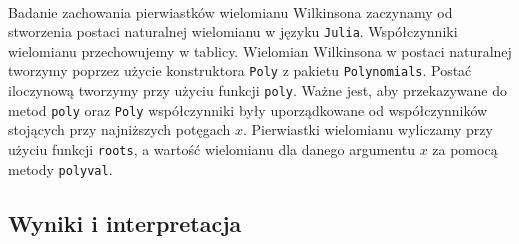 \documentclass[a4paper]{article}
\begin{document}
\paragraph{}
Badanie zachowania pierwiastków wielomianu Wilkinsona zaczynamy od stworzenia postaci naturalnej wielomianu w języku \texttt{Julia}. Współczynniki wielomianu przechowujemy w tablicy. Wielomian Wilkinsona w postaci naturalnej tworzymy poprzez użycie konstruktora \texttt{Poly} z pakietu \texttt{Polynomials}. Postać iloczynową tworzymy przy użyciu funkcji \texttt{poly}. Ważne jest, aby przekazywane do metod \texttt{poly} oraz \texttt{Poly} współczynniki były uporządkowane od współczynników stojących przy najniższych potęgach $x$. Pierwiastki wielomianu wyliczamy przy użyciu funkcji \texttt{roots}, a wartość wielomianu dla danego argumentu $x$ za pomocą metody \texttt{polyval}.
\clearpage
\subsection{Wyniki i interpretacja}
\paragraph{}
\end{document}
